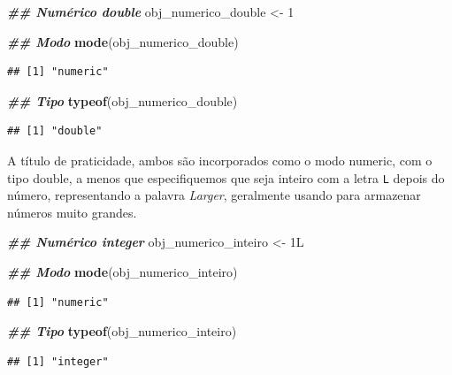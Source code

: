 \documentclass[
]{article}
\newenvironment{Shaded}{\begin{snugshade}}{\end{snugshade}}
\newcommand{\DecValTok}[1]{\textcolor[rgb]{0.00,0.00,0.81}{#1}}
\newcommand{\DocumentationTok}[1]{\textcolor[rgb]{0.56,0.35,0.01}{\textbf{\textit{#1}}}}
\newcommand{\FunctionTok}[1]{\textcolor[rgb]{0.13,0.29,0.53}{\textbf{#1}}}
\newcommand{\NormalTok}[1]{#1}
\newcommand{\OtherTok}[1]{\textcolor[rgb]{0.56,0.35,0.01}{#1}}
\begin{document}
\begin{Shaded}
\begin{Highlighting}[]
\DocumentationTok{\#\# Numérico double}
\NormalTok{obj\_numerico\_double }\OtherTok{\textless{}{-}} \DecValTok{1}

\DocumentationTok{\#\# Modo}
\FunctionTok{mode}\NormalTok{(obj\_numerico\_double)}
\end{Highlighting}
\end{Shaded}

\begin{verbatim}
## [1] "numeric"
\end{verbatim}

\begin{Shaded}
\begin{Highlighting}[]
\DocumentationTok{\#\# Tipo}
\FunctionTok{typeof}\NormalTok{(obj\_numerico\_double)}
\end{Highlighting}
\end{Shaded}

\begin{verbatim}
## [1] "double"
\end{verbatim}

A título de praticidade, ambos são incorporados como o modo numeric, com o tipo double, a menos que especifiquemos que seja inteiro com a letra \texttt{L} depois do número, representando a palavra \emph{Larger}, geralmente usando para armazenar números muito grandes.

\begin{Shaded}
\begin{Highlighting}[]
\DocumentationTok{\#\# Numérico integer}
\NormalTok{obj\_numerico\_inteiro }\OtherTok{\textless{}{-}}\NormalTok{ 1L}

\DocumentationTok{\#\# Modo}
\FunctionTok{mode}\NormalTok{(obj\_numerico\_inteiro)}
\end{Highlighting}
\end{Shaded}

\begin{verbatim}
## [1] "numeric"
\end{verbatim}

\begin{Shaded}
\begin{Highlighting}[]
\DocumentationTok{\#\# Tipo}
\FunctionTok{typeof}\NormalTok{(obj\_numerico\_inteiro)}
\end{Highlighting}
\end{Shaded}

\begin{verbatim}
## [1] "integer"
\end{verbatim}
\end{document}
